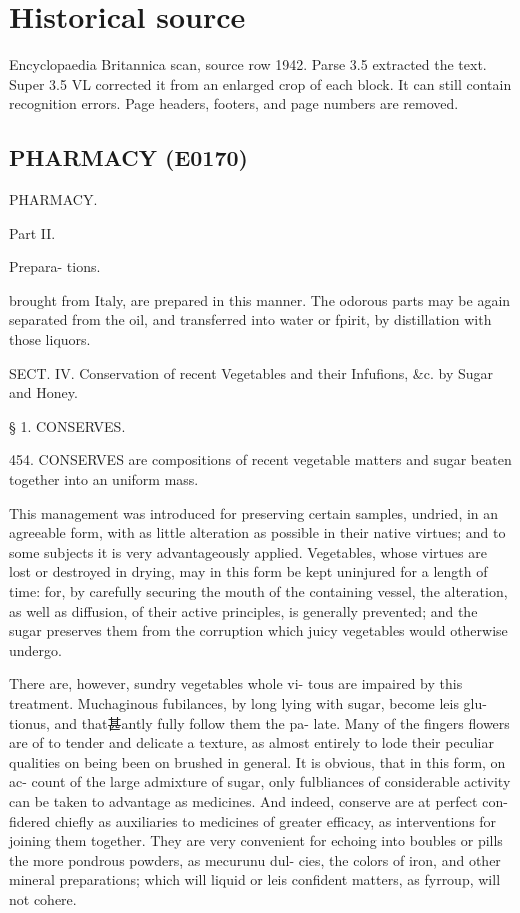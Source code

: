 \documentclass{article}
\begin{document}
\section*{Historical source}
Encyclopaedia Britannica scan, source row 1942. Parse 3.5 extracted the text. Super 3.5 VL corrected it from an enlarged crop of each block. It can still contain recognition errors.
Page headers, footers, and page numbers are removed.

\subsection*{PHARMACY (E0170)}
PHARMACY.

Part II.

Prepara-
tions.

brought from Italy, are prepared in this manner. The
odorous parts may be again separated from the oil,
and transferred into water or fpirit, by distillation with
those liquors.

SECT. IV. Conservation of recent Vegetables and their Infufions, \&c. by Sugar and Honey.

§ 1. CONSERVES.

454. CONSERVES are compositions of recent vegetable matters and sugar beaten together into an uniform mass.

This management was introduced for preserving certain samples, undried, in an agreeable form, with as little alteration as possible in their native virtues; and to some subjects it is very advantageously applied. Vegetables, whose virtues are lost or destroyed in drying, may in this form be kept uninjured for a length of time: for, by carefully securing the mouth of the containing vessel, the alteration, as well as diffusion, of their active principles, is generally prevented; and the sugar preserves them from the corruption which juicy vegetables would otherwise undergo.

There are, however, sundry vegetables whole vi-
tous are impaired by this treatment. Muchaginous
fubilances, by long lying with sugar, become leis glu-
tionus, and that甚antly fully follow them the pa-
late. Many of the fingers flowers are of to tender
and delicate a texture, as almost entirely to lode their
peculiar qualities on being been on brushed
in general. It is obvious, that in this form, on ac-
count of the large admixture of sugar, only fulbliances
of considerable activity can be taken to advantage as
medicines. And indeed, conserve are at perfect con-
fidered chiefly as auxiliaries to medicines of greater
efficacy, as interventions for joining them together.
They are very convenient for echoing into boubles or
pills the more pondrous powders, as mecurunu dul-
cies, the colors of iron, and other mineral preparations;
which will liquid or leis confident matters, as fyrroup,
will not cohere.
\end{document}
